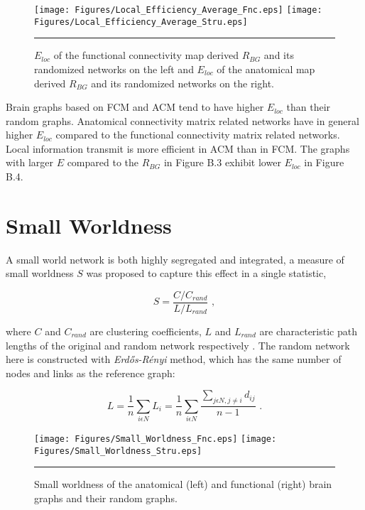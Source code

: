 \begin{figure}[htbp]
 
  \centering
	 \texttt{[image: Figures/Local\_Efficiency\_Average\_Fnc.eps]}
	 \texttt{[image: Figures/Local\_Efficiency\_Average\_Stru.eps]}
	\rule{35em}{0.5pt}  
  \caption[Local Efficiency]{$E_{loc}$ of the functional connectivity map derived $R_{BG}$ and its randomized networks on the left and $E_{loc}$ of the anatomical map derived $R_{BG}$ and its randomized networks on the right. } 
    \label{fig:Local Efficiency}
 	
\end{figure}

Brain graphs based on FCM and ACM tend to have higher $E_{loc}$ than their random graphs. Anatomical connectivity matrix related networks have in general higher $E_{loc}$ compared to the functional connectivity matrix related networks. Local information transmit is more efficient in ACM than in FCM. The graphs with larger $E$ compared to the $R_{BG}$ in Figure B.3 exhibit lower $E_{loc}$ in Figure B.4.   


\section{Small Worldness}

A small world network is both highly segregated and integrated, a measure of small worldness $S$ was proposed to capture this effect in a single statistic,

\begin{equation}
S = \frac{C/C_{rand}}{L/L_{rand}} \,\, ,
\end{equation}
 
where $C$ and $C_{rand}$ are clustering coefficients, $L$ and $L_{rand}$ are characteristic path lengths of the original and random network respectively \citep{HUM08}. The random network here is constructed with \textit{Erd\H{o}s-R\'{e}nyi} method, which has the same number of nodes and links as the reference graph:

\begin{equation}
L = \frac{1}{n}\sum\limits_{i \epsilon N} L_i = \frac{1}{n}\sum\limits_{i \epsilon N} \frac{\sum\limits_{j \epsilon N, j \neq i }d_{ij}}{n-1 } \,\, .
\end{equation}


\begin{figure}[htbp]
 
  \centering
	 \texttt{[image: Figures/Small\_Worldness\_Fnc.eps]}
	 \texttt{[image: Figures/Small\_Worldness\_Stru.eps]}
	\rule{35em}{0.5pt}
  \caption[Small Worldness]{Small worldness of the anatomical (left) and functional (right) brain graphs and their random graphs.} 
    \label{fig:Small Worldness}
 	
\end{figure}


